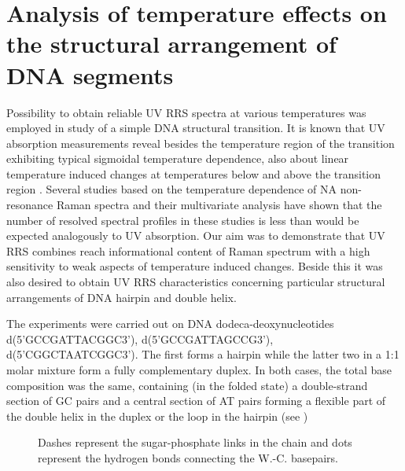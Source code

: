 \section{%
	Analysis of temperature effects on the structural arrangement of DNA segments
}

Possibility to obtain reliable UV RRS spectra at various temperatures was
employed in study of a simple DNA structural transition.
It is known that UV absorption measurements reveal besides the temperature
region of the transition exhibiting typical sigmoidal temperature dependence,
also about linear temperature induced changes at temperatures below and above
the transition region
\parencite{%
	Owczarzy1997,%
	Owczarzy2005,%
	Mergny2009%
}.
Several studies
\parencite{%
	Leulliot1999b,%
	Stepanek2007,%
	Vachousek2008%
}
based on the temperature dependence of NA non-resonance Raman spectra and their
multivariate analysis have shown that the number of resolved spectral profiles
in these studies is less than would be expected analogously to UV absorption.
Our aim was to demonstrate that UV RRS combines reach informational content of
Raman spectrum with a high sensitivity to weak aspects of temperature induced
changes.
Beside this it was also desired to obtain UV RRS characteristics concerning
particular structural arrangements of DNA hairpin and double helix.

The experiments were carried out on DNA dodeca-deoxynucleotides
d(5'GCCG\allowbreak{}ATTACGGC3'), d(5'GCCGATTAGCCG3'), d(5'CGGCTAATCGGC3').
The first forms a hairpin while the latter two in a 1:1 molar mixture form a
fully complementary duplex.
In both cases, the total base composition was the same, containing (in the
folded state) a double-strand section of GC pairs and a central section of AT
pairs forming a flexible part of the double helix in the duplex or the loop in
the hairpin
(see )

\begin{figure}
	\centering
	\caption[%
		Scheme of an arrangement of the studied dodecadeoxynucleotides in the
		folded state.
	]{%
		Dashes represent the sugar-phosphate links in the chain and dots represent
		the hydrogen bonds connecting the W.-C. basepairs.
	}
	\label{\figlabel{dna_hairpins:structure}}
\end{figure}

